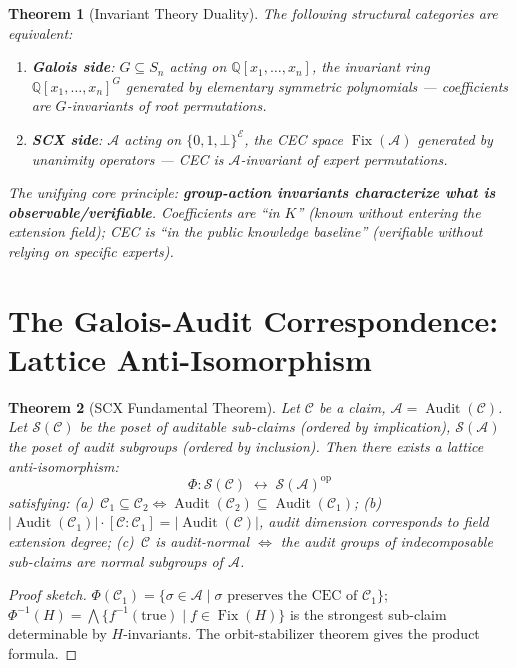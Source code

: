 \documentclass[10pt,a4paper]{article}
\newtheorem{theorem}{Theorem}[section]
\theoremstyle{remark}
\DeclareMathOperator{\Audit}{Audit}
\DeclareMathOperator{\Fix}{Fix}
\newcommand{\Q}{\mathbb{Q}}
\newcommand{\A}{\mathcal{A}}
\newcommand{\E}{\mathcal{E}}
\newcommand{\cC}{\mathcal{C}}
\newcommand{\sS}{\mathcal{S}}
\newcommand{\abs}[1]{\lvert#1\rvert}
\begin{document}
\begin{theorem}[Invariant Theory Duality]\label{thm:invariant}
The following structural categories are equivalent:
\begin{enumerate}[label=(\roman*)]
  \item \textbf{Galois side}: $G\subseteq S_n$ acting on $\Q[x_1,\ldots,x_n]$, the invariant ring $\Q[x_1,\ldots,x_n]^G$ generated by elementary symmetric polynomials — coefficients are $G$-invariants of root permutations.
  \item \textbf{SCX side}: $\A$ acting on $\{0,1,\bot\}^{\E}$, the CEC space $\Fix(\A)$ generated by unanimity operators — CEC is $\A$-invariant of expert permutations.
\end{enumerate}
The unifying core principle: \textbf{group-action invariants characterize what is observable/verifiable}. Coefficients are ``in $K$'' (known without entering the extension field); CEC is ``in the public knowledge baseline'' (verifiable without relying on specific experts).
\end{theorem}

\section{The Galois-Audit Correspondence: Lattice Anti-Isomorphism}

\begin{theorem}[SCX Fundamental Theorem]\label{thm:fundamental}
Let $\cC$ be a claim, $\A=\Audit(\cC)$. Let $\sS(\cC)$ be the poset of auditable sub-claims (ordered by implication), $\sS(\A)$ the poset of audit subgroups (ordered by inclusion). Then there exists a lattice anti-isomorphism:
\begin{equation}
\Phi: \sS(\cC) \;\longleftrightarrow\; \sS(\A)^{\mathrm{op}}
\end{equation}
satisfying: (a)~$\cC_1\subseteq\cC_2 \iff \Audit(\cC_2)\subseteq\Audit(\cC_1)$; (b)~$\abs{\Audit(\cC_1)}\cdot[\cC:\cC_1]=\abs{\Audit(\cC)}$, audit dimension corresponds to field extension degree; (c)~$\cC$ is audit-normal $\iff$ the audit groups of indecomposable sub-claims are normal subgroups of $\A$.
\end{theorem}

\begin{proof}[Proof sketch]
$\Phi(\cC_1)=\{\sigma\in\A\mid\sigma\text{ preserves the CEC of }\cC_1\}$; $\Phi^{-1}(H)=\bigwedge\{f^{-1}(\text{true})\mid f\in\Fix(H)\}$ is the strongest sub-claim determinable by $H$-invariants. The orbit-stabilizer theorem gives the product formula.
\end{proof}
\end{document}
